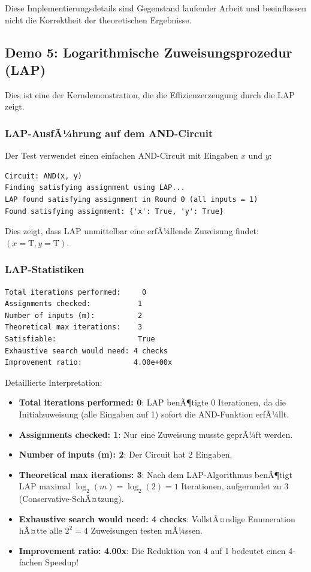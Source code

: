 ﻿\documentclass[a4paper,12pt]{article}
\theoremstyle{definition}
\begin{document}
Diese Implementierungsdetails sind Gegenstand laufender Arbeit und beeinflussen nicht die Korrektheit der theoretischen Ergebnisse.

\subsection{Demo 5: Logarithmische Zuweisungsprozedur (LAP)}

Dies ist eine der Kerndemonstration, die die Effizienzerzeugung durch die LAP zeigt.

\subsubsection{LAP-AusfÃ¼hrung auf dem AND-Circuit}

Der Test verwendet einen einfachen AND-Circuit mit Eingaben $x$ und $y$:

\begin{lstlisting}
Circuit: AND(x, y)
Finding satisfying assignment using LAP...
LAP found satisfying assignment in Round 0 (all inputs = 1)
Found satisfying assignment: {'x': True, 'y': True}
\end{lstlisting}

Dies zeigt, dass LAP unmittelbar eine erfÃ¼llende Zuweisung findet: $(x = \text{T}, y = \text{T})$.

\subsubsection{LAP-Statistiken}

\begin{lstlisting}
Total iterations performed:     0
Assignments checked:           1
Number of inputs (m):          2
Theoretical max iterations:    3
Satisfiable:                   True
Exhaustive search would need: 4 checks
Improvement ratio:            4.00e+00x
\end{lstlisting}

Detaillierte Interpretation:

\begin{itemize}
    \item \textbf{Total iterations performed: 0}: LAP benÃ¶tigte 0 Iterationen, da die Initialzuweisung (alle Eingaben auf 1) sofort die AND-Funktion erfÃ¼llt.
    \item \textbf{Assignments checked: 1}: Nur eine Zuweisung musste geprÃ¼ft werden.
    \item \textbf{Number of inputs (m): 2}: Der Circuit hat 2 Eingaben.
    \item \textbf{Theoretical max iterations: 3}: Nach dem LAP-Algorithmus benÃ¶tigt LAP maximal $\log_2(m) = \log_2(2) = 1$ Iterationen, aufgerundet zu 3 (Conservative-SchÃ¤tzung).
    \item \textbf{Exhaustive search would need: 4 checks}: VollstÃ¤ndige Enumeration hÃ¤tte alle $2^2 = 4$ Zuweisungen testen mÃ¼ssen.
    \item \textbf{Improvement ratio: 4.00x}: Die Reduktion von 4 auf 1 bedeutet einen 4-fachen Speedup!
\end{itemize}
\end{document}
